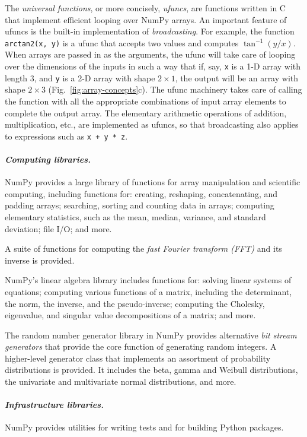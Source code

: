 The \emph{universal functions}, or more concisely, \emph{ufuncs},
are functions written in C that implement efficient looping over
NumPy arrays. An important feature of ufuncs is the built-in
implementation of \emph{broadcasting}.  For example, the function
\texttt{arctan2(x, y)} is a ufunc that accepts two values and computes
$\tan^{-1}(y/x)$.  When arrays are passed in as the arguments,
the ufunc will take care of looping over the dimensions of the inputs
in such a way that if, say, \texttt{x} is a 1-D array with length 3, and
\texttt{y} is a 2-D array with shape $2 \times 1$, the output will be
an array with shape $2 \times 3$ (Fig.~\ref{fig:array-concepts}c).
The ufunc machinery takes care
of calling the function with all the appropriate combinations of
input array elements to complete the output array.
The elementary arithmetic operations of addition, multiplication, etc.,
are implemented as ufuncs, so that broadcasting also applies to expressions
such as \texttt{x + y * z}.

\paragraph{\emph{Computing libraries.}}
NumPy provides a large library of functions for array manipulation
and scientific computing, including functions for: creating, reshaping,
concatenating, and padding arrays; searching, sorting and counting data
in arrays; computing elementary statistics, such as the mean, median,
variance, and standard deviation; file I/O; and more.

A suite of functions for computing the \emph{fast Fourier transform (FFT)}
and its inverse is provided.

NumPy's linear algebra library includes functions for: solving linear
systems of equations; computing various functions of a matrix, including
the determinant, the norm, the inverse, and the pseudo-inverse;
computing the Cholesky, eigenvalue, and singular value decompositions of a matrix;
and more.

The random number generator library in NumPy provides alternative
\emph{bit stream generators} that provide the core function of generating
random integers.
A higher-level generator class that implements an assortment of
probability distributions is provided. It includes the beta, gamma
and Weibull distributions, the univariate and multivariate normal
distributions, and more.

\paragraph{\emph{Infrastructure libraries.}} NumPy provides utilities
for writing tests and for building Python packages.

